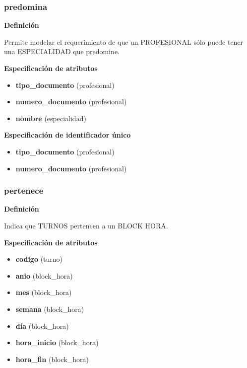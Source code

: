 \documentclass[a4paper,11pt]{article}
\begin{document}
\subsubsection{\textbf{predomina}}

\textbf{Definición}

Permite modelar el requerimiento de que un PROFESIONAL sólo puede tener una ESPECIALIDAD 
que predomine.

\textbf{Especificación de atributos}


\begin{itemize}

     \item \textbf{tipo\_documento} (profesional)

     \item \textbf{numero\_documento} (profesional)
	 
	 \item \textbf{nombre} (especialidad)

\end{itemize}

\textbf{Especificación de identificador único}

\begin{itemize}

     \item \textbf{tipo\_documento} (profesional)

     \item \textbf{numero\_documento} (profesional)

\end{itemize}

\subsubsection{\textbf{pertenece}}

\textbf{Definición}

Indica que TURNOS pertencen a un BLOCK HORA.

\textbf{Especificación de atributos}


\begin{itemize}
	\item \textbf{codigo} (turno)
	\item \textbf{anio} (block\_hora)
	\item \textbf{mes} (block\_hora)
	\item \textbf{semana} (block\_hora)
	\item \textbf{día} (block\_hora)
	\item \textbf{hora\_inicio} (block\_hora)
	\item \textbf{hora\_fin} (block\_hora)

\end{itemize}
\end{document}
